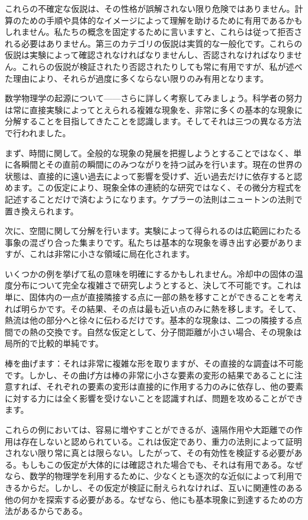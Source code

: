 \documentclass[a4paper,11pt,openany]{ltjsbook}
\begin{document}
これらの不確定な仮説は、その性格が誤解されない限り危険ではありません。計算のための手順や具体的なイメージによって理解を助けるために有用であるかもしれません。私たちの概念を固定するために言いますと、これらは従って拒否される必要はありません。第三のカテゴリの仮説は実質的な一般化です。これらの仮説は実験によって確認されなければなりませんし、否認されなければなりません。これらの仮説が検証されたり否認されたりしても常に有用ですが、私が述べた理由により、それらが過度に多くならない限りのみ有用となります。

数学物理学の起源について——さらに詳しく考察してみましょう。科学者の努力は常に直接実験によってとえられる複雑な現象を、非常に多くの基本的な現象に分解することを目指してきたことを認識します。そしてそれは三つの異なる方法で行われました。

まず、時間に関して。全般的な現象の発展を把握しようとすることではなく、単に各瞬間とその直前の瞬間にのみつながりを持つ試みを行います。現在の世界の状態は、直接的に遠い過去によって影響を受けず、近い過去だけに依存すると認めます。この仮定により、現象全体の連続的な研究ではなく、その微分方程式を記述することだけで済むようになります。ケプラーの法則はニュートンの法則で置き換えられます。

次に、空間に関して分解を行います。実験によって得られるのは広範囲にわたる事象の混ざり合った集まりです。私たちは基本的な現象を導き出す必要がありますが、これは非常に小さな領域に局在化されます。

いくつかの例を挙げて私の意味を明確にするかもしれません。冷却中の固体の温度分布について完全な複雑さで研究しようとすると、決して不可能です。これは単に、固体内の一点が直接隣接する点に一部の熱を移すことができることを考えれば明らかです。その結果、その点は最も近い点のみに熱を移します。そして、熱流は他の部分へと徐々に伝わるだけです。基本的な現象は、二つの隣接する点間での熱の交換です。自然な仮定として、分子間距離が小さい場合、その現象は局所的で比較的単純です。

棒を曲げます：それは非常に複雑な形を取りますが、その直接的な調査は不可能です。しかし、その曲げ方は棒の非常に小さな要素の変形の結果であることに注意すれば、それぞれの要素の変形は直接的に作用する力のみに依存し、他の要素に対する力には全く影響を受けないことを認識すれば、問題を攻めることができます。

これらの例においては、容易に増やすことができるが、遠隔作用や大距離での作用は存在しないと認められている。これは仮定であり、重力の法則によって証明されない限り常に真とは限らない。したがって、その有効性を検証する必要がある。もしもこの仮定が大体的には確認された場合でも、それは有用である。なぜなら、数学的物理学を利用するために、少なくとも逐次的な近似によって利用できるからだ。しかし、その仮定が検証に耐えられなければ、互いに関連性のある他の何かを探索する必要がある。なぜなら、他にも基本現象に到達するための方法があるからである。
\end{document}
